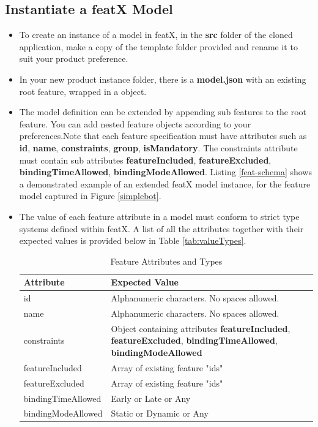 \documentclass{article}
\begin{document}
\subsection{Instantiate a featX Model}
\begin{itemize}
	\item To create an instance of a model in featX, in the \textbf{src} folder of the cloned application, make a copy of the template folder provided and rename it to suit your product preference.
	
	\item In your new product instance folder, there is a \textbf{model.json} with an existing root feature, wrapped in a object.
	
	\item The model definition can be extended by appending sub features to the root feature. You can add nested feature objects according to your preferences.Note that each feature specification must have attributes such as \textbf{id}, \textbf{name}, \textbf{constraints}, \textbf{group}, \textbf{isMandatory}. The constraints attribute must contain sub attributes \textbf{featureIncluded}, \textbf{featureExcluded}, \textbf{bindingTimeAllowed}, \textbf{bindingModeAllowed}. Listing \ref{feat-schema} shows a demonstrated example of an extended featX model instance, for the feature model captured in Figure \ref{simplebot}.
	
	\item The value of each feature attribute in a model must conform to strict type systems defined within featX. A list of all the attributes together with their expected values is provided below in Table \ref{tab:valueTypes}.
	
	\begin{table}[H]
		\centering
		\caption{Feature Attributes and Types}
			\begin{tabular}{l|p{10cm}}
				\hline
				Attribute & Expected Value \\\hline
				id & Alphanumeric characters. No spaces allowed.   \\ \hline
				name & Alphanumeric characters. No spaces allowed.   \\ \hline
				constraints & Object containing attributes \textbf{featureIncluded}, \textbf{featureExcluded}, \textbf{bindingTimeAllowed}, \textbf{bindingModeAllowed}  \\ \hline
				featureIncluded & Array of existing feature "ids" \\ \hline
				
				featureExcluded & Array of existing feature "ids" \\ \hline
				bindingTimeAllowed & Early or Late or Any \\ \hline
				bindingModeAllowed & Static or Dynamic or Any \\ \hline
				

\end{tabular}
\end{table}
\end{itemize}
\end{document}
